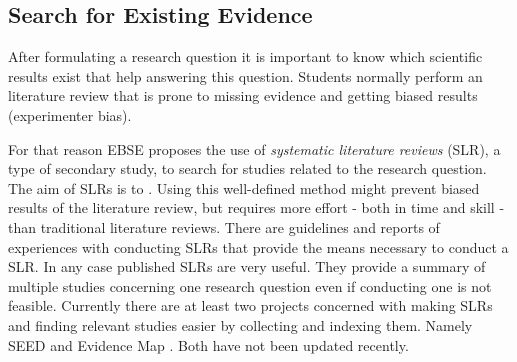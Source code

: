 
\subsection{Search for Existing Evidence}
\label{subsec:search for existing evidence} 

After formulating a research question it is important to know which scientific results exist that help answering this question. Students normally perform an  literature review that is prone to missing evidence and getting biased results (experimenter bias).

For that reason EBSE proposes the use of \emph{systematic literature reviews} (SLR), a type of secondary study, to search for studies related to the research question. The aim of SLRs is to  \cite{Zhang2011}. Using this well-defined method might prevent biased results of the literature review, but requires more effort - both in time and skill - than traditional literature reviews. There are guidelines \cite{keele2007,Wohlin2014,Zhang2011} and reports of experiences with conducting SLRs \cite{Brereton2007} that provide the means necessary to conduct a SLR. In any case published SLRs are very useful. They provide a summary of multiple studies concerning one research question even if conducting one is not feasible. Currently there are at least two projects concerned with making SLRs and finding relevant studies easier by collecting and indexing them. Namely SEED \cite{Janzen2008} and Evidence Map \cite{EBSEWeb}. Both have not been updated recently. 

